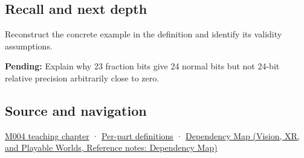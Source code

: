 \subsection{Recall and next depth}\label{appendix-a24fd710cf67-recall-and-next-depth}

Reconstruct the concrete example in the definition and identify its validity assumptions.

\textbf{Pending:} Explain why 23 fraction bits give 24 normal bits but not 24-bit relative precision arbitrarily close to zero.

\subsection{Source and navigation}\label{appendix-a24fd710cf67-source-and-navigation}

\hyperref[01-foundations-i-ch001-a-stretching-ruler-for-real-valued-quantities]{M004 teaching chapter} · \hyperref[appendix-fd090d982a15-m004---parts-61-76]{Per-part definitions} · \href{../07-Vision-XR-and-Playable-Worlds/main.pdf\#nameddest=appendix-4ad47bdd269a}{Dependency Map (Vision, XR, and Playable Worlds, Reference notes: Dependency Map)}

